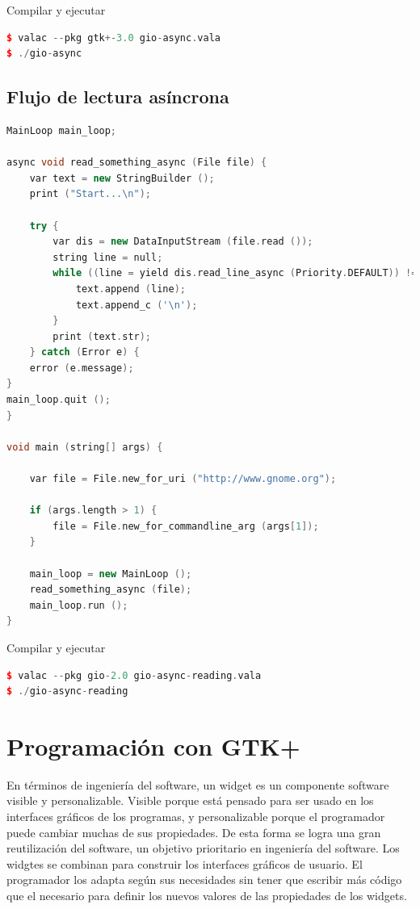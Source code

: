 \documentclass[12pt,twoside]{book}
\begin{document}
Compilar y ejecutar

\begin{lstlisting}[language=C++]
$ valac --pkg gtk+-3.0 gio-async.vala
$ ./gio-async
\end{lstlisting}


\section{Flujo de lectura asíncrona}


\begin{lstlisting}[language=C++]
MainLoop main_loop;

async void read_something_async (File file) {
	var text = new StringBuilder ();
	print ("Start...\n");
	
	try {
		var dis = new DataInputStream (file.read ());
		string line = null;
		while ((line = yield dis.read_line_async (Priority.DEFAULT)) != null) {
			text.append (line);
			text.append_c ('\n');
		}
		print (text.str);
	} catch (Error e) {
	error (e.message);
}
main_loop.quit ();
}

void main (string[] args) {
	
	var file = File.new_for_uri ("http://www.gnome.org");
	
	if (args.length > 1) {
		file = File.new_for_commandline_arg (args[1]);
	}
	
	main_loop = new MainLoop ();
	read_something_async (file);
	main_loop.run ();
}
\end{lstlisting}

Compilar y ejecutar

\begin{lstlisting}[language=C++]
$ valac --pkg gio-2.0 gio-async-reading.vala
$ ./gio-async-reading
\end{lstlisting}


\chapter{Programación con GTK+}

En términos de ingeniería del software, un widget es un componente software visible y personalizable. Visible porque está pensado para ser usado en los interfaces gráficos de los programas, y personalizable porque el programador puede cambiar muchas de sus propiedades. De esta forma se logra una gran reutilización del software, un objetivo prioritario en ingeniería del software. Los widgtes se combinan para construir los interfaces gráficos de usuario. El programador los adapta según sus necesidades sin tener que escribir más código que el necesario para definir los nuevos valores de las propiedades de los widgets.
\end{document}
